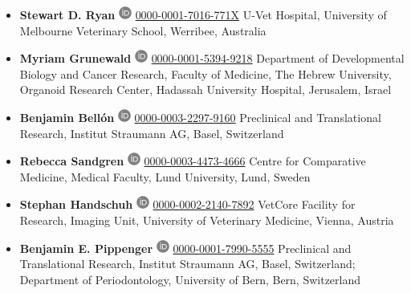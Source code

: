 \begin{itemize}
\item
  \textbf{Stewart D. Ryan}
  \includegraphics[width=0.16667in,height=0.16667in]{images/orcid.svg}
  \href{https://orcid.org/0000-0001-7016-771X}{0000-0001-7016-771X}
  U-Vet Hospital, University of Melbourne Veterinary School, Werribee, Australia
\item
  \textbf{Myriam Grunewald}
  \includegraphics[width=0.16667in,height=0.16667in]{images/orcid.svg}
  \href{https://orcid.org/0000-0001-5394-9218}{0000-0001-5394-9218}
  Department of Developmental Biology and Cancer Research, Faculty of Medicine, The Hebrew University, Organoid Research Center, Hadassah University Hospital, Jerusalem, Israel
\item
  \textbf{Benjamin Bellón}
  \includegraphics[width=0.16667in,height=0.16667in]{images/orcid.svg}
  \href{https://orcid.org/0000-0003-2297-9160}{0000-0003-2297-9160}
  Preclinical and Translational Research, Institut Straumann AG, Basel, Switzerland
\item
  \textbf{Rebecca Sandgren}
  \includegraphics[width=0.16667in,height=0.16667in]{images/orcid.svg}
  \href{https://orcid.org/0000-0003-4473-4666}{0000-0003-4473-4666}
  Centre for Comparative Medicine, Medical Faculty, Lund University, Lund, Sweden
\item
  \textbf{Stephan Handschuh}
  \includegraphics[width=0.16667in,height=0.16667in]{images/orcid.svg}
  \href{https://orcid.org/0000-0002-2140-7892}{0000-0002-2140-7892}
  VetCore Facility for Research, Imaging Unit, University of Veterinary Medicine, Vienna, Austria
\item
  \textbf{Benjamin E. Pippenger}
  \includegraphics[width=0.16667in,height=0.16667in]{images/orcid.svg}
  \href{https://orcid.org/0000-0001-7990-5555}{0000-0001-7990-5555}
  Preclinical and Translational Research, Institut Straumann AG, Basel, Switzerland; Department of Periodontology, University of Bern, Bern, Switzerland

\end{itemize}
